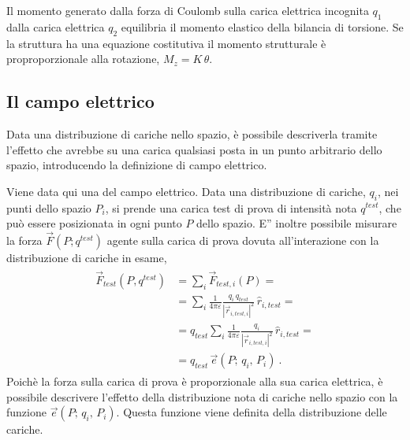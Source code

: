 \documentclass[letterpaper,10pt,italian]{jupyterBook}
\begin{document}
\sphinxAtStartPar
Il momento generato dalla forza di Coulomb sulla carica elettrica incognita \(q_1\) dalla carica elettrica \(q_2\) equilibria il momento elastico della bilancia di torsione. Se la struttura ha una equazione costitutiva il momento strutturale è proproporzionale alla rotazione, \(M_z = K \, \theta\).

\sphinxAtStartPar
{} 

\begin{figure}[htbp]
\centering

\noindent{}
\end{figure}


\subsection{Il campo elettrico}
\label{\detokenize{ch/electromagnetism/electrostatics:il-campo-elettrico}}
\sphinxAtStartPar
Data una distribuzione di cariche nello spazio, è possibile descriverla tramite l’effetto che avrebbe su una carica qualsiasi posta in un punto arbitrario dello spazio, introducendo la definizione di campo elettrico.

\sphinxAtStartPar
Viene data qui una  del campo elettrico. Data una distribuzione di cariche, \(q_i\), nei punti dello spazio \(P_i\), si prende una carica test \sphinxhyphen{} di prova \sphinxhyphen{} di intensità nota \(q^{test}\), che può essere posizionata in ogni punto \(P\) dello spazio. E” inoltre possibile misurare la forza \(\vec{F}(P; q^{test})\) agente sulla carica di prova dovuta all’interazione con la distribuzione di cariche in esame,
\begin{equation*}
\begin{split}\begin{aligned}
  \vec{F}_{test}(P, q^{test})
  & = \sum_i \vec{F}_{test,i}(P) = \\
  & = \sum_i \frac{1}{4 \pi \varepsilon}\frac{q_i \, q_{test}}{|\vec{r}_{i,test,i}|^2} \, \hat{r}_{i,test} = \\
  & = q_{test} \sum_i \frac{1}{4 \pi \varepsilon}\frac{q_i}{|\vec{r}_{i,test,i}|^2} \, \hat{r}_{i,test} = \\
  & = q_{test} \, \vec{e}(P; \, q_i, \, P_i) \ .
\end{aligned}\end{split}
\end{equation*}
\sphinxAtStartPar
Poichè la forza sulla carica di prova è proporzionale alla sua carica elettrica, è possibile descrivere l’effetto della distribuzione nota di cariche nello spazio con la funzione \(\vec{e}(P; \, q_i, \, P_i)\). Questa funzione viene definita  della distribuzione delle cariche.
\end{document}
